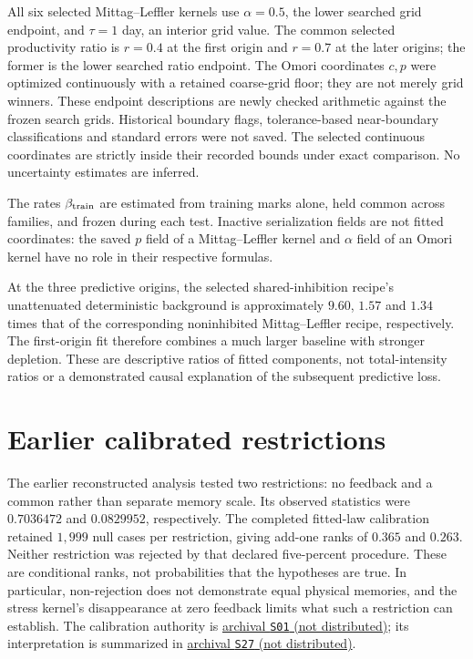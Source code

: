 All six selected Mittag--Leffler kernels use \(\alpha=0.5\), the lower searched grid endpoint, and \(\tau=1\) day, an interior grid value. The common selected productivity ratio is \(r=0.4\) at the first origin and \(r=0.7\) at the later origins; the former is the lower searched ratio endpoint. The Omori coordinates \(c,p\) were optimized continuously with a retained coarse-grid floor; they are not merely grid winners. These endpoint descriptions are newly checked arithmetic against the frozen search grids. Historical boundary flags, tolerance-based near-boundary classifications and standard errors were not saved. The selected continuous coordinates are strictly inside their recorded bounds under exact comparison. No uncertainty estimates are inferred.

The rates \(\beta_{\rm train}\) are estimated from training marks alone, held common across families, and frozen during each test. Inactive serialization fields are not fitted coordinates: the saved \(p\) field of a Mittag--Leffler kernel and \(\alpha\) field of an Omori kernel have no role in their respective formulas. 

At the three predictive origins, the selected shared-inhibition recipe's
unattenuated deterministic background is approximately \(9.60\), \(1.57\)
and \(1.34\) times that of the corresponding noninhibited Mittag--Leffler
recipe, respectively. The first-origin fit therefore combines a much larger
baseline with stronger depletion. These are descriptive ratios of fitted
components, not total-intensity ratios or a demonstrated causal explanation
of the subsequent predictive loss.

\section{Earlier calibrated restrictions}

The earlier reconstructed analysis tested two restrictions: no feedback and a common rather than separate memory scale. Its observed statistics were \(0.7036472\) and \(0.0829952\), respectively. The completed fitted-law calibration retained \(1{,}999\) null cases per restriction, giving add-one ranks of \(0.365\) and \(0.263\). Neither restriction was rejected by that declared five-percent procedure. These are conditional ranks, not probabilities that the hypotheses are true. In particular, non-rejection does not demonstrate equal physical memories, and the stress kernel's disappearance at zero feedback limits what such a restriction can establish. The calibration authority is \hyperlink{S01}{archival \texttt{S01} (not distributed)}; its interpretation is summarized in \hyperlink{S27}{archival \texttt{S27} (not distributed)}.

